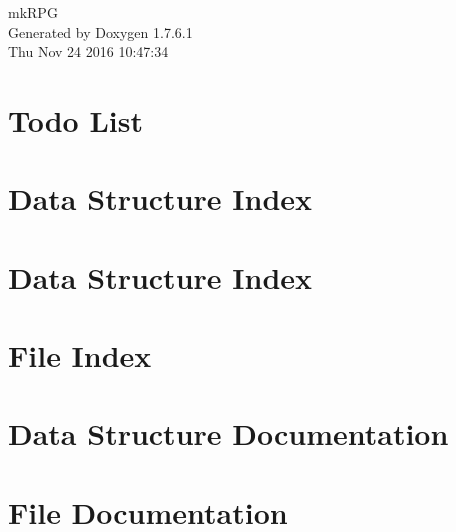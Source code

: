 \documentclass[a4paper]{book}
\begin{document}
\hypersetup{pageanchor=false,citecolor=blue}
\begin{titlepage}
\vspace*{7cm}
\begin{center}
{\Large mk\-R\-P\-G }\\
\vspace*{1cm}
{\large \-Generated by Doxygen 1.7.6.1}\\
\vspace*{0.5cm}
{\small Thu Nov 24 2016 10:47:34}\\
\end{center}
\end{titlepage}
\clearemptydoublepage
{}
\tableofcontents
\clearemptydoublepage
{}
\hypersetup{pageanchor=true,citecolor=blue}
\chapter{\-Todo \-List}
\label{todo}
\hypertarget{todo}{}

\chapter{\-Data \-Structure \-Index}

\chapter{\-Data \-Structure \-Index}

\chapter{\-File \-Index}

\chapter{\-Data \-Structure \-Documentation}













































\chapter{\-File \-Documentation}










\printindex
\end{document}
